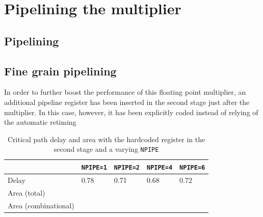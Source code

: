 \chapter{Pipelining the multiplier}
\section{Pipelining}

\section{Fine grain pipelining}
In order to further boost the performance of this floating point multiplier, an additional pipeline register has been inserted in the second stage just after the multiplier. In this case, however, it has been explicitly coded instead of relying of the automatic retiming
\begin{table}
	
	\begin{tabular}{|l|l|l|l|l|}
	\hline
	&\texttt{NPIPE=1} & \texttt{NPIPE=2} & \texttt{NPIPE=4} & \texttt{NPIPE=6}\\\hline
	Delay & 0.78 & 0.71 & 0.68 & 0.72 \\\hline
	Area (total) & & & & \\\hline
	Area (combinational) & & & & \\\hline
	\end{tabular}

	\caption{Critical path delay and area with the hardcoded register in the second stage and a varying \texttt{NPIPE}}
	\label{tab:stage2}
\end{table}

